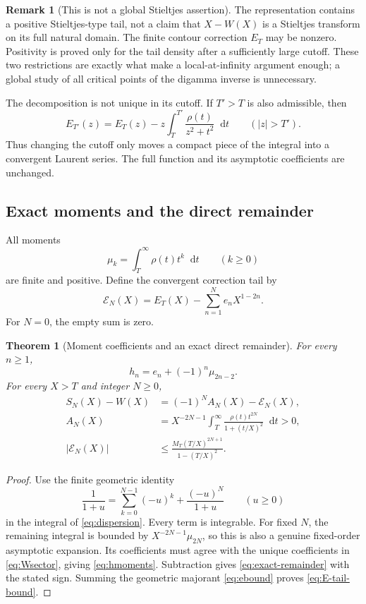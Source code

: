 \documentclass[11pt,a4paper]{article}
\newtheorem{theorem}{Theorem}[section]
\theoremstyle{definition}
\newtheorem{remark}[remark]{Remark}
\numberwithin{equation}{section}
\newcommand{\dd}{\mathop{}\!\mathrm{d}}
\newcommand{\ctail}{\mathcal E}
\begin{document}
\begin{remark}[This is not a global Stieltjes assertion]
The representation contains a positive Stieltjes-type tail, not a claim
that $X-W(X)$ is a Stieltjes transform on its full natural domain.
The finite contour correction $E_T$ may be nonzero. Positivity is proved
only for the tail density after a sufficiently large cutoff. These two
restrictions are exactly what make a local-at-infinity argument enough;
a global study of all critical points of the digamma inverse is unnecessary.
\end{remark}

The decomposition is not unique in its cutoff. If $T'>T$ is also
admissible, then
\begin{equation}
 E_{T'}(z)=E_T(z)-z\int_T^{T'}\frac{\rho(t)}{z^2+t^2}\dd t
 \qquad (|z|>T').
 \label{eq:cutoffchange}
\end{equation}
Thus changing the cutoff only moves a compact piece of the integral into
a convergent Laurent series. The full function and its asymptotic
coefficients are unchanged.

\subsection{Exact moments and the direct remainder}
All moments
\begin{equation}
 \mu_k=\int_T^\infty\rho(t)t^k\dd t\qquad(k\ge0)
 \label{eq:moments}
\end{equation}
are finite and positive. Define the convergent correction tail by
\begin{equation}
 \ctail_N(X)=E_T(X)-\sum_{n=1}^Ne_nX^{1-2n}.
 \label{eq:E-tail}
\end{equation}
For $N=0$, the empty sum is zero.

\begin{theorem}[Moment coefficients and an exact direct remainder]
\label{thm:remainder}
For every $n\ge1$,
\begin{equation}
 h_n=e_n+(-1)^n\mu_{2n-2}.
 \label{eq:hmoments}
\end{equation}
For every $X>T$ and integer $N\ge0$,
\begin{align}
 S_N(X)-W(X)&=(-1)^N A_N(X)-\ctail_N(X),\label{eq:exact-remainder}\\
 A_N(X)&=X^{-2N-1}\int_T^\infty
        \frac{\rho(t)t^{2N}}{1+(t/X)^2}\dd t>0,\label{eq:AN}\\
 |\ctail_N(X)|&\le
       \frac{M_T(T/X)^{2N+1}}{1-(T/X)^2}.\label{eq:E-tail-bound}
\end{align}
\end{theorem}
\begin{proof}
Use the finite geometric identity
\[
 \frac1{1+u}=\sum_{k=0}^{N-1}(-u)^k+\frac{(-u)^N}{1+u}
 \qquad(u\ge0)
\]
in the integral of \eqref{eq:dispersion}. Every term is integrable.
For fixed $N$, the remaining integral is bounded by
$X^{-2N-1}\mu_{2N}$, so this is also a genuine fixed-order asymptotic
expansion. Its coefficients must agree with the unique coefficients in
\eqref{eq:Wsector}, giving \eqref{eq:hmoments}. Subtraction gives
\eqref{eq:exact-remainder} with the stated sign. Summing the geometric
majorant \eqref{eq:ebound} proves \eqref{eq:E-tail-bound}.
\end{proof}
\end{document}
